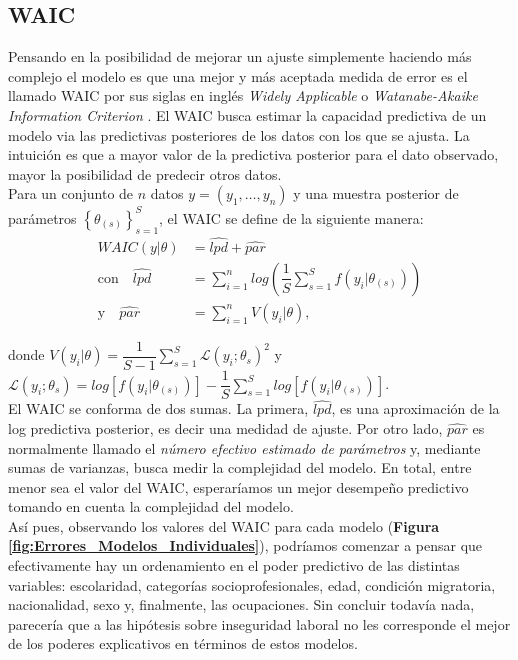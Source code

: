 \subsection{WAIC}

Pensando en la posibilidad de mejorar un ajuste simplemente haciendo más complejo el modelo es que una mejor y más aceptada medida de error es el llamado WAIC por sus siglas en inglés \textit{Widely Applicable} o \textit{Watanabe-Akaike Information Criterion} \parencite{Vehtari16}. El WAIC busca estimar la capacidad predictiva de un modelo via las predictivas posteriores de los datos con los que se ajusta. La intuición es que a mayor valor de la predictiva posterior para el dato observado, mayor la posibilidad de predecir otros datos.\\ 

Para un conjunto de $n$ datos $y=(y_1,\dots,y_n)$ y una muestra posterior de parámetros $\left\lbrace\theta_{(s)}\right\rbrace_{s=1}^S$, el WAIC se define de la siguiente manera:
\begin{align}\label{WAIC}
WAIC(y|\theta) &= \widehat{lpd} + \widehat{par} \\
\text{con} \quad \widehat{lpd} &= \sum_{i=1}^{n} log\left(\dfrac{1}{S}\sum\limits_{s=1}^S f(y_i|\theta_{(s)}) \right) \nonumber \\
\text{y} \quad \widehat{par} &= \sum\limits_{i=1}^n V(y_i|\theta), \nonumber
\end{align}

donde $V(y_i|\theta)=\dfrac{1}{S-1}\sum\limits_{s=1}^S \mathcal{L}(y_i;\theta_{s})^2$ y $\mathcal{L}(y_i;\theta_{s}) = log\left[f(y_i|\theta_{(s)})\right] - \dfrac{1}{S}\sum\limits_{s=1}^S log\left[f(y_i|\theta_{(s)})\right]$.{}\\

El WAIC se conforma de dos sumas. La primera, $\widehat{lpd}$, es una aproximación de la log predictiva posterior, es decir una medidad de ajuste. Por otro lado, $\widehat{par}$ es normalmente llamado el \textit{número efectivo estimado de parámetros} y, mediante sumas de varianzas, busca medir la complejidad del modelo. En total, entre menor sea el valor del WAIC, esperaríamos un mejor desempeño predictivo tomando en cuenta la complejidad del modelo.\\

Así pues, observando los valores del WAIC para cada modelo (\textbf{Figura \ref{fig:Errores_Modelos_Individuales}}), podríamos comenzar a pensar que efectivamente hay un ordenamiento en el poder predictivo de las distintas variables: escolaridad, categorías socioprofesionales, edad, condición migratoria, nacionalidad, sexo y, finalmente, las ocupaciones. Sin concluir todavía nada, parecería que a las hipótesis sobre inseguridad laboral no les corresponde el mejor de los poderes explicativos en términos de estos modelos.\\

